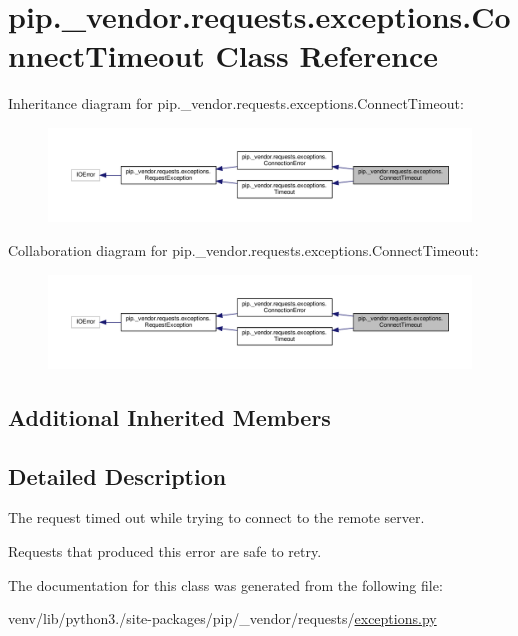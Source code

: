 \hypertarget{classpip_1_1__vendor_1_1requests_1_1exceptions_1_1ConnectTimeout}{}\section{pip.\+\_\+vendor.\+requests.\+exceptions.\+Connect\+Timeout Class Reference}
\label{classpip_1_1__vendor_1_1requests_1_1exceptions_1_1ConnectTimeout}


Inheritance diagram for pip.\+\_\+vendor.\+requests.\+exceptions.\+Connect\+Timeout\+:
\nopagebreak
\begin{figure}[H]
\begin{center}
\leavevmode
\includegraphics[width=350pt]{classpip_1_1__vendor_1_1requests_1_1exceptions_1_1ConnectTimeout__inherit__graph}
\end{center}
\end{figure}


Collaboration diagram for pip.\+\_\+vendor.\+requests.\+exceptions.\+Connect\+Timeout\+:
\nopagebreak
\begin{figure}[H]
\begin{center}
\leavevmode
\includegraphics[width=350pt]{classpip_1_1__vendor_1_1requests_1_1exceptions_1_1ConnectTimeout__coll__graph}
\end{center}
\end{figure}
\subsection*{Additional Inherited Members}


\subsection{Detailed Description}
\begin{DoxyVerb}The request timed out while trying to connect to the remote server.

Requests that produced this error are safe to retry.
\end{DoxyVerb}
 

The documentation for this class was generated from the following file\+:\begin{DoxyCompactItemize}
\item 
venv/lib/python3./site-\/packages/pip/\+\_\+vendor/requests/\hyperlink{pip_2__vendor_2requests_2exceptions_8py}{exceptions.\+py}\end{DoxyCompactItemize}
